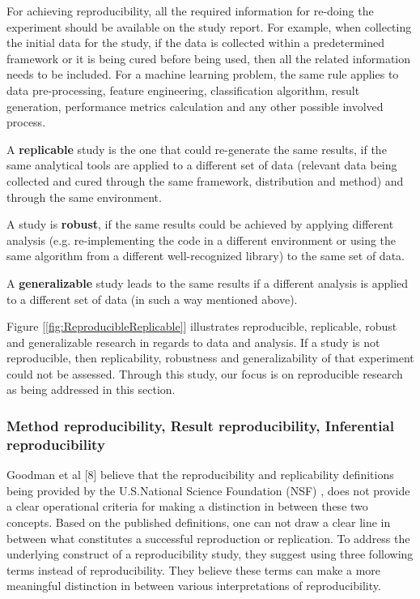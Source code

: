 For achieving reproducibility, all the required information for re-doing the experiment should be available on the 
study report. For example, when collecting the initial data for the study, if the data is collected within a predetermined 
framework or it is being cured before being used, then all the related information needs to be included. For a machine learning 
problem, the same rule applies to data pre-processing, feature engineering, classification algorithm, result generation, 
performance metrics calculation and any other possible involved process.

A \textbf{replicable} study is the one that could re-generate the same results, if the same analytical tools are applied to a 
different set of data (relevant data being collected and cured through the same framework, distribution and method) and 
through the same environment.

A study is \textbf{robust}, if the same results could be achieved by applying different analysis (e.g. re-implementing the code 
in a different environment or using the same algorithm from a different well-recognized library) to the same set of data.

A \textbf{generalizable} study leads to the same results if a different analysis is applied to a different set of data 
(in such a way mentioned above). 

Figure [\ref{fig:ReproducibleReplicable}] illustrates reproducible, replicable, robust and generalizable research in regards 
to data and analysis. If a study is not reproducible, then replicability, robustness and generalizability of that experiment 
could not be assessed. Through this study, our focus is on reproducible research as being addressed in this section.

\subsubsection{Method reproducibility, Result reproducibility, Inferential reproducibility}
Goodman et al [8] believe that the reproducibility and replicability definitions being provided by the U.S.National 
Science Foundation (NSF) \cite{cacioppo_social_2015}, does not provide a clear operational criteria for making a distinction 
in between these two concepts. Based on the published definitions, one can not draw a clear line in between what constitutes 
a successful reproduction or replication. To address the underlying construct of a reproducibility study, they suggest using 
three following terms instead of reproducibility. They believe these terms can make a more meaningful distinction in between 
various interpretations of reproducibility.

